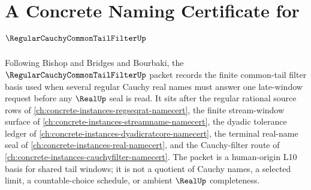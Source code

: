 \chapter{A Concrete Naming Certificate for $\RegularCauchyCommonTailFilterUp$}
\label{ch:concrete-instances-regular-cauchy-common-tail-filter-namecert}

Following Bishop and Bridges and Bourbaki, the $\RegularCauchyCommonTailFilterUp$ packet records the finite common-tail filter basis used when several regular Cauchy real names must answer one late-window request before any $\RealUp$ seal is read. It sits after the regular rational source rows of \autoref{ch:concrete-instances-regseqrat-namecert}, the finite stream-window surface of \autoref{ch:concrete-instances-streamname-namecert}, the dyadic tolerance ledger of \autoref{ch:concrete-instances-dyadicratcore-namecert}, the terminal real-name seal of \autoref{ch:concrete-instances-real-namecert}, and the Cauchy-filter route of \autoref{ch:concrete-instances-cauchyfilter-namecert}. The packet is a human-origin L10 basis for shared tail windows; it is not a quotient of Cauchy names, a selected limit, a countable-choice schedule, or ambient $\RealUp$ completeness.

